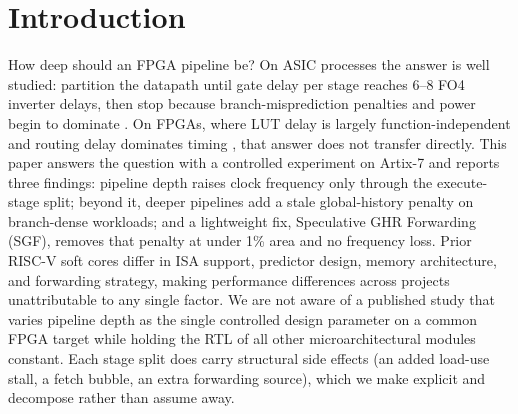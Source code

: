 \documentclass[acmsmall,nonacm,screen]{acmart}
\begin{document}


\maketitle

\section{Introduction}
\label{sec:intro}

How deep should an FPGA pipeline be?
On ASIC processes the answer is well studied: partition the datapath until gate delay per stage reaches 6--8 FO4 inverter delays, then stop because branch-misprediction penalties and power begin to dominate \cite{hrishikesh2002optimal, sprangle2002increasing, hartstein2002optimum}.
On FPGAs, where LUT delay is largely function-independent and routing delay dominates timing \cite{xilinx_7series, kuon2007measuring}, that answer does not transfer directly.
This paper answers the question with a controlled experiment on Artix-7 and reports three findings: pipeline depth raises clock frequency only through the execute-stage split; beyond it, deeper pipelines add a stale global-history penalty on branch-dense workloads; and a lightweight fix, Speculative GHR Forwarding (SGF), removes that penalty at under 1\% area and no frequency loss.
Prior RISC-V soft cores differ in ISA support, predictor design, memory architecture, and forwarding strategy, making performance differences across projects unattributable to any single factor.
We are not aware of a published study that varies pipeline depth as the single controlled design parameter on a common FPGA target while holding the RTL of all other microarchitectural modules constant. Each stage split does carry structural side effects (an added load-use stall, a fetch bubble, an extra forwarding source), which we make explicit and decompose rather than assume away.
\end{document}
